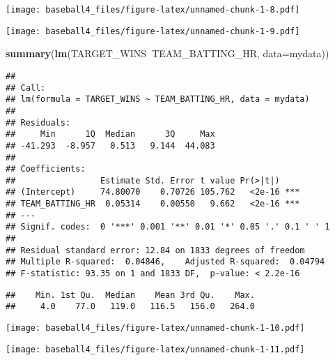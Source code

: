 \documentclass[
]{article}
\newenvironment{Shaded}{\begin{snugshade}}{\end{snugshade}}
\newcommand{\DataTypeTok}[1]{\textcolor[rgb]{0.13,0.29,0.53}{#1}}
\newcommand{\KeywordTok}[1]{\textcolor[rgb]{0.13,0.29,0.53}{\textbf{#1}}}
\newcommand{\NormalTok}[1]{#1}
\newcommand{\OperatorTok}[1]{\textcolor[rgb]{0.81,0.36,0.00}{\textbf{#1}}}
\begin{document}
\texttt{[image: baseball4\_files/figure-latex/unnamed-chunk-1-8.pdf]}

\begin{Shaded}
\end{Shaded}

\texttt{[image: baseball4\_files/figure-latex/unnamed-chunk-1-9.pdf]}

\begin{Shaded}
\begin{Highlighting}[]
\KeywordTok{summary}\NormalTok{(}\KeywordTok{lm}\NormalTok{(TARGET_WINS}\OperatorTok{~}\NormalTok{TEAM_BATTING_HR, }\DataTypeTok{data=}\NormalTok{mydata))}
\end{Highlighting}
\end{Shaded}

\begin{verbatim}
## 
## Call:
## lm(formula = TARGET_WINS ~ TEAM_BATTING_HR, data = mydata)
## 
## Residuals:
##     Min      1Q  Median      3Q     Max 
## -41.293  -8.957   0.513   9.144  44.083 
## 
## Coefficients:
##                 Estimate Std. Error t value Pr(>|t|)    
## (Intercept)     74.80070    0.70726 105.762   <2e-16 ***
## TEAM_BATTING_HR  0.05314    0.00550   9.662   <2e-16 ***
## ---
## Signif. codes:  0 '***' 0.001 '**' 0.01 '*' 0.05 '.' 0.1 ' ' 1
## 
## Residual standard error: 12.84 on 1833 degrees of freedom
## Multiple R-squared:  0.04846,    Adjusted R-squared:  0.04794 
## F-statistic: 93.35 on 1 and 1833 DF,  p-value: < 2.2e-16
\end{verbatim}

\begin{Shaded}
\end{Shaded}

\begin{verbatim}
##    Min. 1st Qu.  Median    Mean 3rd Qu.    Max. 
##     4.0    77.0   119.0   116.5   156.0   264.0
\end{verbatim}

\begin{Shaded}
\end{Shaded}

\texttt{[image: baseball4\_files/figure-latex/unnamed-chunk-1-10.pdf]}

\begin{Shaded}
\end{Shaded}

\texttt{[image: baseball4\_files/figure-latex/unnamed-chunk-1-11.pdf]}
\end{document}
